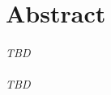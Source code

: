 \chapter*{Abstract}
\subsubsection*{\hsmatitelen}
\emph{TBD} %

\subsubsection*{\hsmatitelde}
\emph{TBD} %
